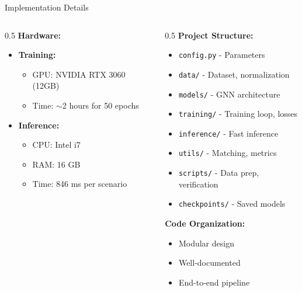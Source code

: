 \documentclass[aspectratio=169]{beamer}
\begin{document}
\begin{frame}{Implementation Details}
\begin{columns}
\begin{column}{0.5\textwidth}
            \textbf{Hardware:}
            \begin{itemize}
                \item \textbf{Training:}
                \begin{itemize}
                    \item GPU: NVIDIA RTX 3060 (12GB)
                    \item Time: $\sim$2 hours for 50 epochs
                \end{itemize}
                \item \textbf{Inference:}
                \begin{itemize}
                    \item CPU: Intel i7
                    \item RAM: 16 GB
                    \item Time: 846 ms per scenario
                \end{itemize}
            \end{itemize}
        \end{column}
        \begin{column}{0.5\textwidth}
            \textbf{Project Structure:}
            \begin{itemize}
                \item \texttt{config.py} - Parameters
                \item \texttt{data/} - Dataset, normalization
                \item \texttt{models/} - GNN architecture
                \item \texttt{training/} - Training loop, losses
                \item \texttt{inference/} - Fast inference
                \item \texttt{utils/} - Matching, metrics
                \item \texttt{scripts/} - Data prep, verification
                \item \texttt{checkpoints/} - Saved models
            \end{itemize}
            
            \vspace{0.3cm}
            
            \textbf{Code Organization:}
            \begin{itemize}
                \item Modular design
                \item Well-documented
                \item End-to-end pipeline
            \end{itemize}
        \end{column}
    \end{columns}
\end{frame}
\end{document}
